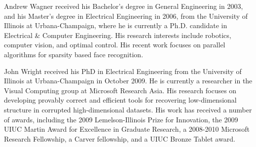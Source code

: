 \documentclass[10pt,journal,letterpaper,compsoc]{IEEEtran}
\begin{document}



\newcommand{\biospace}{\vspace{-4em}}
\biospace
\begin{IEEEbiography}{Andrew Wagner}
received his Bachelor's degree in General Engineering in 2003,
and his Master's degree in Electrical Engineering in 2006, from the University
of Illinois at Urbana-Champaign, where he is currently a Ph.D.
candidate in Electrical \& Computer Engineering.
His research interests include robotics, computer vision, and optimal control.
His recent work focuses on parallel algorithms for sparsity
based face recognition.\end{IEEEbiography}

\biospace
\begin{IEEEbiography}{John
Wright} received his PhD in Electrical Engineering from the
University of Illinois at Urbana-Champaign in October 2009. He is currently a
researcher in the Visual Computing group at Microsoft Research Asia.  His
research focuses on developing provably correct and efficient tools for
recovering low-dimensional structure in corrupted high-dimensional datasets.
His work has received a number of awards, including the 2009 Lemelson-Illinois
Prize for Innovation, the 2009 UIUC Martin Award for Excellence in Graduate
Research, a 2008-2010 Microsoft Research Fellowship, a Carver fellowship, and a
UIUC Bronze Tablet award.  \end{IEEEbiography}
\end{document}
